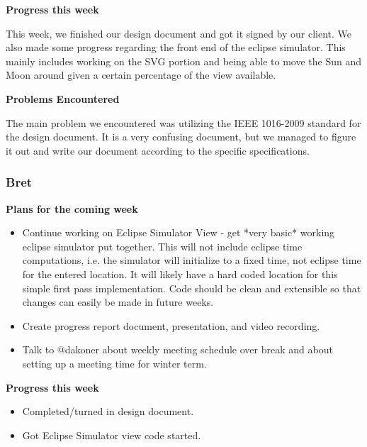 \documentclass[10pt, onecolumn, draftclsnofoot, letterpaper, compsoc]{IEEEtran}
\begin{document}
     \noindent \textbf{Progress this week}

    This week, we finished our design document and got it signed by our client.
    We also made some progress regarding the front end of the eclipse simulator.
    This mainly includes working on the SVG portion and being able to move the Sun
    and Moon around given a certain percentage of the view available.

     \noindent \textbf{Problems Encountered}

    The main problem we encountered was utilizing the IEEE 1016-2009 standard for
    the design document. It is a very confusing document, but we managed to figure
    it out and write our document according to the specific specifications.

    \subsubsection{Bret}

    \noindent \textbf{Plans for the coming week}

    \begin{itemize}

    \item Continue working on Eclipse Simulator View - get *very basic* working eclipse simulator put together.
      This will not include eclipse time computations, i.e. the simulator will initialize to a fixed time,
      not eclipse time for the entered location. It will likely have a hard coded location for this simple
      first pass implementation. Code should be clean and extensible so that changes can easily be made
      in future weeks.
    \item Create progress report document, presentation, and video recording.
    \item Talk to @dakoner about weekly meeting schedule over break and about setting up a meeting time for winter
      term.

    \end{itemize}

    \noindent \textbf{Progress this week}

    \begin{itemize}

    \item Completed/turned in design document.
    \item Got Eclipse Simulator view code started.

    \end{itemize}
\end{document}
